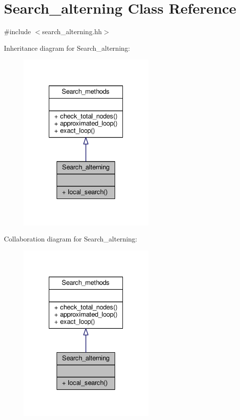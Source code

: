 \hypertarget{classSearch__alterning}{\section{Search\-\_\-alterning Class Reference}
\label{classSearch__alterning}
}


{\ttfamily \#include $<$search\-\_\-alterning.\-hh$>$}



Inheritance diagram for Search\-\_\-alterning\-:\nopagebreak
\begin{figure}[H]
\begin{center}
\leavevmode
\includegraphics[width=192pt]{classSearch__alterning__inherit__graph}
\end{center}
\end{figure}


Collaboration diagram for Search\-\_\-alterning\-:\nopagebreak
\begin{figure}[H]
\begin{center}
\leavevmode
\includegraphics[width=192pt]{classSearch__alterning__coll__graph}
\end{center}
\end{figure}
